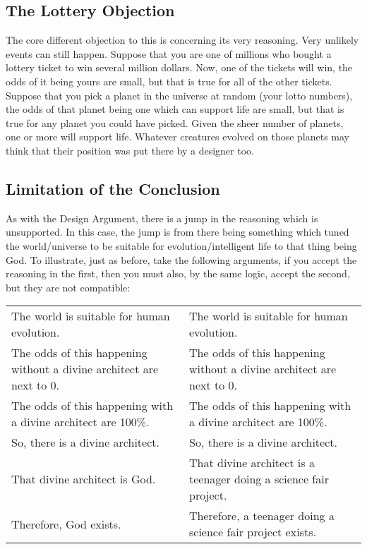 \subsection{The Lottery Objection}

The core different objection to this is concerning its very reasoning. Very unlikely events can still happen. Suppose that you are one of millions who bought a lottery ticket to win several million dollars. Now, one of the tickets will win, the odds of it being yours are small, but that is true for all of the other tickets. Suppose that you pick a planet in the universe at random (your lotto numbers), the odds of that planet being one which can support life are small, but that is true for any planet you could have picked. Given the sheer number of planets, one or more will support life. Whatever creatures evolved on those planets may think that their position was put there by a designer too.
\subsection{Limitation of the Conclusion}

As with the Design Argument, there is a jump in the reasoning which is unsupported. In this case, the jump is from there being something which tuned the world/universe to be suitable for evolution/intelligent life to that thing being God. To illustrate, just as before, take the following arguments, if you accept the reasoning in the first, then you must also, by the same logic, accept the second, but they are not compatible:
\begin{tabular}{p{2in}|p{2in}}
    The world is suitable for human evolution.&The world is suitable for human evolution.\\
    The odds of this happening without a divine architect are next to 0.& The odds of this happening without a divine architect are next to 0.\\
    The odds of this happening with a divine architect are 100\%.&The odds of this happening with a divine architect are 100\%.\\
    So, there is a divine architect.&So, there is a divine architect.\\
    That divine architect is God.&That divine architect is a teenager doing a science fair project.\\
    Therefore, God exists.&Therefore, a teenager doing a science fair project exists.\\
\end{tabular} 
